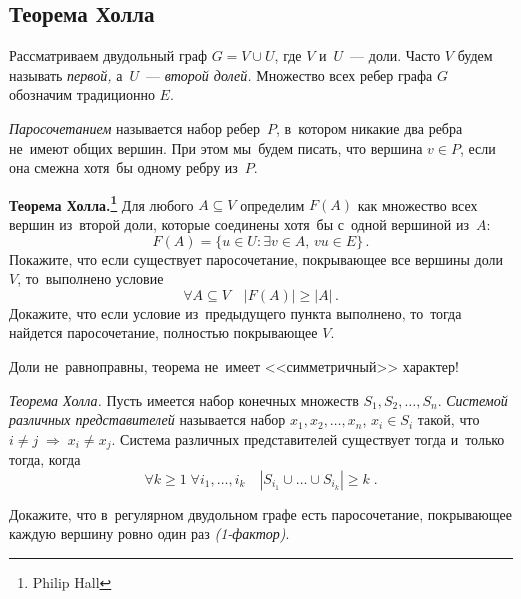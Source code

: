\subsection*{Теорема Холла}

Рассматриваем двудольный граф $G = V \cup U$, где $V$ и~$U$~--- доли.
Часто $V$ будем называть \emph{первой,} а~$U$~--- \emph{второй долей.}
Множество всех ребер графа $G$ обозначим традиционно $E$.

\emph{Паросочетанием} называется набор ребер~$P$, в~котором никакие два ребра
не~имеют общих вершин.
При этом мы~будем писать, что вершина $v \in P$, если она смежна хотя~бы одному
ребру из~$P$.

\begin{problems}

\item\textbf{Теорема Холла.\footnote{Philip Hall}}
Для любого $A \subseteq V$ определим $F(A)$ как множество всех вершин из~второй
доли, которые соединены хотя~бы с~одной вершиной из~$A$:
\[
    F(A)
=
    \{
        u \in U
    \colon
        \exists v \in A
    ,\,
        vu \in E
    \}
\,.\]
\subproblem
Покажите, что если существует паросочетание, покрывающее все вершины доли~$V$,
то~выполнено условие
\[
    \forall A \subseteq V
\quad
    |F(A)| \geq |A|
\,.\]
\subproblem
Докажите, что если условие из~предыдущего пункта выполнено, то~тогда найдется
паросочетание, полностью покрывающее $V$.

\end{problems}

\observation
Доли не~равноправны, теорема не~имеет <<симметричный>> характер!

\begin{problems}

\item\emph{Теорема Холла.}
Пусть имеется набор конечных множеств $S_1, S_2, \ldots, S_n$.
\emph{Системой различных представителей} называется набор
$x_1, x_2, \ldots, x_n$, $x_i \in S_i$ такой, что
\(
    i \neq j
\;\Rightarrow\;
    x_i \neq x_j
\).
Система различных представителей существует тогда и~только тогда, когда
\[
    \forall k \geq 1
\;
    \forall i_1, \ldots, i_k
\quad
    |S_{i_1} \cup \ldots \cup S_{i_k}| \geq k
\;.\]

\item
Докажите, что в~регулярном двудольном графе есть паросочетание, покрывающее
каждую вершину ровно один раз \emph{(1-фактор)}.

\end{problems}

